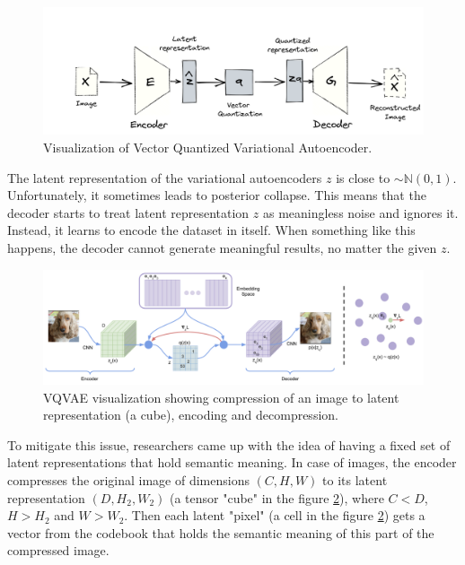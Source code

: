 % 
\begin{figure}[H]
    \centering
    \includegraphics[width=\linewidth]{concept_engineering/vqgan/vqvae.png}
    \caption{Visualization of Vector Quantized Variational Autoencoder\cite{miranda2021vqgan}.}
    \label{fig:vavae1}
\end{figure}

The latent representation of the variational autoencoders $z$ is close to $\sim \mathbb{N}(0,1)$. Unfortunately, it sometimes leads to posterior collapse. This means that the decoder starts to treat latent representation $z$ as meaningless noise and ignores it. Instead, it learns to encode the dataset in itself. When something like this happens, the decoder cannot generate meaningful results, no matter the given $z$. 

\begin{figure}[H]
    \centering
    \includegraphics[width=\linewidth]{concept_engineering/vqvae.png}
    \caption{VQVAE visualization showing compression of an image to latent representation (a cube), encoding and decompression\cite{oord2018neuraldiscreterepresentationlearning}.}
    \label{fig:vqvae-paper}
\end{figure}

To mitigate this issue, researchers\cite{oord2018neuraldiscreterepresentationlearning} came up with the idea of having a fixed set of latent representations that hold semantic meaning. In case of images, the encoder compresses the original image of dimensions $(C,H,W)$ to its latent representation $(D,H_2,W_2)$ (a tensor "cube" in the figure \ref{fig:vqvae-paper}), where $C<D$, $H>H_2$ and $W>W_2$. Then each latent "pixel" (a cell in the figure \ref{fig:vqvae-paper}) gets a vector from the codebook that holds the semantic meaning of this part of the compressed image. 

